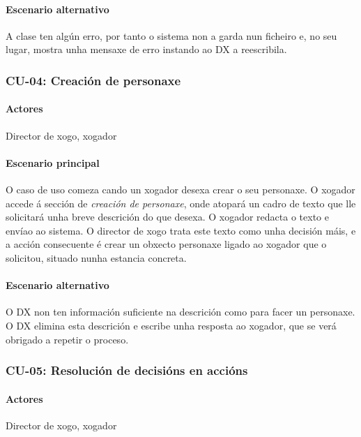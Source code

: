 \paragraph{Escenario alternativo}
A clase ten algún erro, por tanto o sistema non a garda nun ficheiro e, no seu lugar, mostra unha mensaxe de erro instando ao DX a reescribila.

\subsubsection{CU-04: Creación de personaxe}
\paragraph{Actores}
Director de xogo, xogador
\paragraph{Escenario principal}
O caso de uso comeza cando un xogador desexa crear o seu personaxe. O xogador accede á sección de {\it creación de personaxe}, onde atopará un cadro de texto que lle solicitará unha breve descrición do que desexa. O xogador redacta o texto e envíao ao sistema.
O director de xogo trata este texto como unha decisión máis, e a acción consecuente é crear un obxecto personaxe ligado ao xogador que o solicitou, situado nunha estancia concreta.

\paragraph{Escenario alternativo}
O DX non ten información suficiente na descrición como para facer un personaxe. O DX elimina esta descrición e escribe unha resposta ao xogador, que se verá obrigado a repetir o proceso.

\subsubsection{CU-05: Resolución de decisións en accións}
\paragraph{Actores}
Director de xogo, xogador

